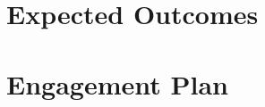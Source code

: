 \documentclass[12pt]{elsarticle}
\begin{document}
\section{Expected Outcomes}

\section{Engagement Plan}
\end{document}
